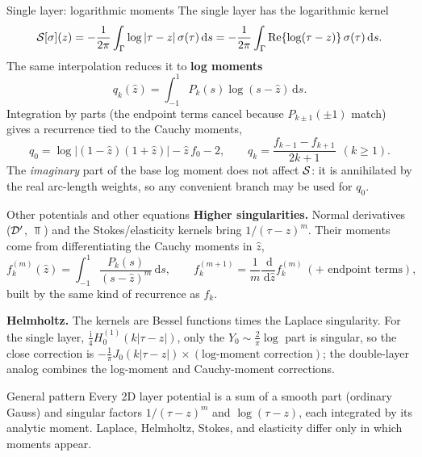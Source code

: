 \documentclass[aspectratio=169,11pt]{beamer}
\newcommand{\dd}{\,\mathrm d}
\newcommand{\ii}{\mathrm i}
\newcommand{\hl}[1]{{\color{CCMorange}\textbf{#1}}}
\begin{document}
\begin{frame}{Single layer: logarithmic moments}
\small
The single layer has the logarithmic kernel
\[
  \Sop[\sigma](z)=-\frac{1}{2\pi}\int_\Gamma\log|\tau-z|\,\sigma(\tau)\dd s
  =-\frac{1}{2\pi}\int_\Gamma\operatorname{Re}\{\log(\tau-z)\}\,\sigma(\tau)\dd s.
\]
The same interpolation reduces it to \hl{log moments}
\[
  q_k(\hat z)=\int_{-1}^{1}P_k(s)\log(s-\hat z)\dd s .
\]
Integration by parts (the endpoint terms cancel because $P_{k\pm1}(\pm1)$ match)
gives a recurrence tied to the Cauchy moments,
\[
  q_0=\log|(1-\hat z)(1+\hat z)|-\hat z\,f_0-2,
  \qquad
  q_k=\frac{f_{k-1}-f_{k+1}}{2k+1}\ \ (k\ge1).
\]
The \emph{imaginary} part of the base log moment does not affect $\mathcal{S}$: it is
annihilated by the real arc-length weights, so any convenient branch may be used
for $q_0$.
\end{frame}

\begin{frame}{Other potentials and other equations}
\small
\textbf{Higher singularities.}  Normal derivatives ($\mathcal{D}^{\prime}$, $\Top$) and the
Stokes/elasticity kernels bring $1/(\tau-z)^m$.  Their moments come from
differentiating the Cauchy moments in $\hat z$,
\[
  f_k^{(m)}(\hat z)=\int_{-1}^1\frac{P_k(s)}{(s-\hat z)^{m}}\dd s,
  \qquad
  f_k^{(m+1)}=\frac1m\frac{\dd}{\dd\hat z}f_k^{(m)}\ (+\text{ endpoint terms}),
\]
built by the same kind of recurrence as $f_k$.

\vspace{1mm}
\textbf{Helmholtz.}  The kernels are Bessel functions times the Laplace
singularity.  For the single layer,
$\tfrac{\ii}{4}H_0^{(1)}(k|\tau-z|)$, only the $Y_0\sim\tfrac{2}{\pi}\log$ part
is singular, so the close correction is $-\tfrac1\pi J_0(k|\tau-z|)\times(\text{log-moment correction})$;
the double-layer analog combines the log-moment and Cauchy-moment corrections.

\begin{block}{General pattern}
Every 2D layer potential is a sum of a smooth part (ordinary Gauss) and singular
factors $1/(\tau-z)^m$ and $\log(\tau-z)$, each integrated by its analytic
moment.  Laplace, Helmholtz, Stokes, and elasticity differ only in which moments
appear.
\end{block}
\end{frame}
\end{document}
